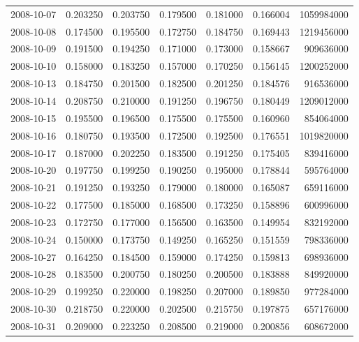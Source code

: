 \begin{tabular}{lrrrrrr}
2008-10-07 &    0.203250 &    0.203750 &    0.179500 &    0.181000 &    0.166004 &  1059984000 \\
2008-10-08 &    0.174500 &    0.195500 &    0.172750 &    0.184750 &    0.169443 &  1219456000 \\
2008-10-09 &    0.191500 &    0.194250 &    0.171000 &    0.173000 &    0.158667 &   909636000 \\
2008-10-10 &    0.158000 &    0.183250 &    0.157000 &    0.170250 &    0.156145 &  1200252000 \\
2008-10-13 &    0.184750 &    0.201500 &    0.182500 &    0.201250 &    0.184576 &   916536000 \\
2008-10-14 &    0.208750 &    0.210000 &    0.191250 &    0.196750 &    0.180449 &  1209012000 \\
2008-10-15 &    0.195500 &    0.196500 &    0.175500 &    0.175500 &    0.160960 &   854064000 \\
2008-10-16 &    0.180750 &    0.193500 &    0.172500 &    0.192500 &    0.176551 &  1019820000 \\
2008-10-17 &    0.187000 &    0.202250 &    0.183500 &    0.191250 &    0.175405 &   839416000 \\
2008-10-20 &    0.197750 &    0.199250 &    0.190250 &    0.195000 &    0.178844 &   595764000 \\
2008-10-21 &    0.191250 &    0.193250 &    0.179000 &    0.180000 &    0.165087 &   659116000 \\
2008-10-22 &    0.177500 &    0.185000 &    0.168500 &    0.173250 &    0.158896 &   600996000 \\
2008-10-23 &    0.172750 &    0.177000 &    0.156500 &    0.163500 &    0.149954 &   832192000 \\
2008-10-24 &    0.150000 &    0.173750 &    0.149250 &    0.165250 &    0.151559 &   798336000 \\
2008-10-27 &    0.164250 &    0.184500 &    0.159000 &    0.174250 &    0.159813 &   698936000 \\
2008-10-28 &    0.183500 &    0.200750 &    0.180250 &    0.200500 &    0.183888 &   849920000 \\
2008-10-29 &    0.199250 &    0.220000 &    0.198250 &    0.207000 &    0.189850 &   977284000 \\
2008-10-30 &    0.218750 &    0.220000 &    0.202500 &    0.215750 &    0.197875 &   657176000 \\
2008-10-31 &    0.209000 &    0.223250 &    0.208500 &    0.219000 &    0.200856 &   608672000 \\

\end{tabular}

